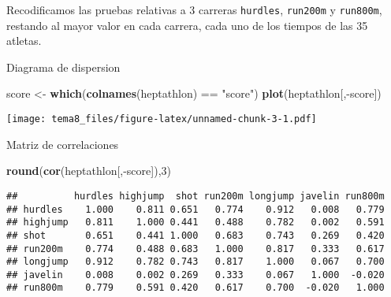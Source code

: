 \documentclass[]{article}
\newenvironment{Shaded}{\begin{snugshade}}{\end{snugshade}}
\newcommand{\KeywordTok}[1]{\textcolor[rgb]{0.13,0.29,0.53}{\textbf{{#1}}}}
\newcommand{\DecValTok}[1]{\textcolor[rgb]{0.00,0.00,0.81}{{#1}}}
\newcommand{\StringTok}[1]{\textcolor[rgb]{0.31,0.60,0.02}{{#1}}}
\newcommand{\NormalTok}[1]{{#1}}
\numberwithin{equation}{section}
\begin{document}
Recodificamos las pruebas relativas a 3 carreras \texttt{hurdles},
\texttt{run200m} y \texttt{run800m}, restando al mayor valor en cada
carrera, cada uno de los tiempos de las 35 atletas.

\begin{Shaded}
\end{Shaded}

Diagrama de dispersion

\begin{Shaded}
\begin{Highlighting}[]
\NormalTok{score <-}\StringTok{ }\KeywordTok{which}\NormalTok{(}\KeywordTok{colnames}\NormalTok{(heptathlon) ==}\StringTok{ "score"}\NormalTok{)}
\KeywordTok{plot}\NormalTok{(heptathlon[,-score])}
\end{Highlighting}
\end{Shaded}

\texttt{[image: tema8\_files/figure-latex/unnamed-chunk-3-1.pdf]}

Matriz de correlaciones

\begin{Shaded}
\begin{Highlighting}[]
\KeywordTok{round}\NormalTok{(}\KeywordTok{cor}\NormalTok{(heptathlon[,-score]),}\DecValTok{3}\NormalTok{)}
\end{Highlighting}
\end{Shaded}

\begin{verbatim}
##          hurdles highjump  shot run200m longjump javelin run800m
## hurdles    1.000    0.811 0.651   0.774    0.912   0.008   0.779
## highjump   0.811    1.000 0.441   0.488    0.782   0.002   0.591
## shot       0.651    0.441 1.000   0.683    0.743   0.269   0.420
## run200m    0.774    0.488 0.683   1.000    0.817   0.333   0.617
## longjump   0.912    0.782 0.743   0.817    1.000   0.067   0.700
## javelin    0.008    0.002 0.269   0.333    0.067   1.000  -0.020
## run800m    0.779    0.591 0.420   0.617    0.700  -0.020   1.000
\end{verbatim}
\end{document}
